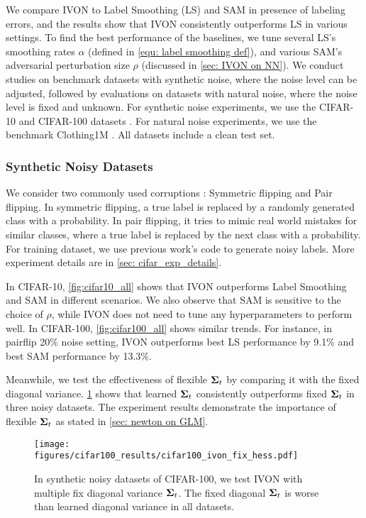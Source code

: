  We compare IVON to Label Smoothing (LS) \citep{Szegedy_rethinking} and SAM \citep{SAM_org} in presence of labeling errors, and the results show that IVON consistently outperforms LS in various settings. To find the best performance of the baselines, we tune several LS's smoothing rates $\alpha$ (defined in \cref{equ: label smoothing def}), and various SAM's adversarial perturbation size $\rho$ (discussed in \cref{sec: IVON on NN}). We conduct studies on benchmark datasets with synthetic noise, where the noise level can be adjusted, followed by evaluations on datasets with natural noise, where the noise level is fixed and unknown. For synthetic noise experiments, we use the CIFAR-10 and CIFAR-100 datasets \citep{yu2019does}. For natural noise experiments, we use the benchmark Clothing1M \citep{xiao2015learning}. All datasets include a clean test set. 

\subsubsection{Synthetic Noisy Datasets} \label{sec: synthetic cifar}
We consider two commonly used corruptions \citep{patrini2017making, li2019learning, yu2019does}: Symmetric flipping and Pair flipping. In symmetric flipping, a true label is replaced by a randomly generated class with a probability. In pair flipping, it tries to mimic real world mistakes for similar classes, where a true label is replaced by the next class with a probability. For training dataset, we use previous work's  \citep{yu2019does} code to generate noisy labels. More experiment details are in \cref{sec: cifar_exp_details}. 


In CIFAR-10, \cref{fig:cifar10_all} shows that IVON outperforms Label Smoothing and SAM in different scenarios. We also observe that SAM is sensitive to the choice of $\rho$, while IVON does not need to tune any hyperparameters to perform well. In CIFAR-100, \cref{fig:cifar100_all} shows similar trends. For instance, in pairflip 20\% noise setting, IVON outperforms best LS performance by 9.1\% and best SAM performance by 13.3\%. 

Meanwhile, we test the effectiveness of flexible $\mbox{$\mbox{$\boldsymbol{\Sigma}$}$}_t$ by comparing it with the fixed diagonal variance. \cref{fig:cifar100_fix_cov} shows that learned $\mbox{$\mbox{$\boldsymbol{\Sigma}$}$}_t$ consistently outperforms fixed $\mbox{$\mbox{$\boldsymbol{\Sigma}$}$}_t$ in three noisy datasets. The experiment results demonstrate the importance of flexible $\mbox{$\mbox{$\boldsymbol{\Sigma}$}$}_t$ as stated in \cref{sec: newton on GLM}.

\begin{figure}[t]
    \centering 
    \texttt{[image: figures/cifar100\_results/cifar100\_ivon\_fix\_hess.pdf]}
    \caption{In synthetic noisy datasets of CIFAR-100, we test IVON with multiple fix diagonal variance $\mbox{$\mbox{$\boldsymbol{\Sigma}$}$}_t$. The fixed diagonal $\mbox{$\mbox{$\boldsymbol{\Sigma}$}$}_t$ is worse than learned diagonal variance in all datasets.}
        \label{fig:cifar100_fix_cov}
\end{figure}

